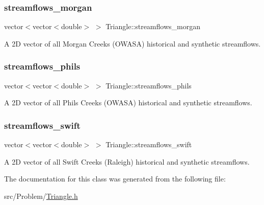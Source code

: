 \subsubsection{\texorpdfstring{streamflows\+\_\+morgan}{streamflows\_morgan}}
{\footnotesize\ttfamily vector$<$vector$<$double$>$ $>$ Triangle\+::streamflows\+\_\+morgan\hspace{0.3cm}{\ttfamily [private]}}



A 2D vector of all Morgan Creek\textquotesingle{}s (O\+W\+A\+SA) historical and synthetic streamflows. 

\mbox{\label{classTriangle_a936a703fc9bb94bce59bb0cbec005115}} 
\subsubsection{\texorpdfstring{streamflows\+\_\+phils}{streamflows\_phils}}
{\footnotesize\ttfamily vector$<$vector$<$double$>$ $>$ Triangle\+::streamflows\+\_\+phils\hspace{0.3cm}{\ttfamily [private]}}



A 2D vector of all Phils Creek\textquotesingle{}s (O\+W\+A\+SA) historical and synthetic streamflows. 

\mbox{\label{classTriangle_a6fc8ddba9b9c2afea0ff19ac21343807}} 
\subsubsection{\texorpdfstring{streamflows\+\_\+swift}{streamflows\_swift}}
{\footnotesize\ttfamily vector$<$vector$<$double$>$ $>$ Triangle\+::streamflows\+\_\+swift\hspace{0.3cm}{\ttfamily [private]}}



A 2D vector of all Swift Creek\textquotesingle{}s (Raleigh) historical and synthetic streamflows. 



The documentation for this class was generated from the following file\+:\begin{DoxyCompactItemize}
\item 
src/\+Problem/\mbox{\hyperlink{Triangle_8h}{Triangle.\+h}}\end{DoxyCompactItemize}
